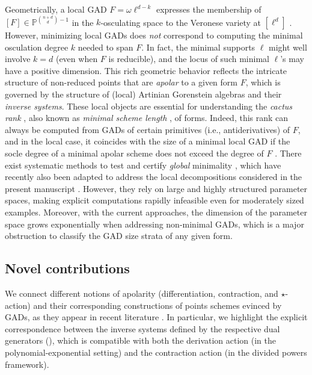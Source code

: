 \documentclass{amsart}
\theoremstyle{plain}
\renewcommand{\P}{\mathbb{P}}
\def\P{{\mathbb{P}}}
\numberwithin{equation}{section}
\begin{document}
Geometrically, a local GAD $F = \omega \ell^{d-k}$ expresses the membership of $[F] \in \P^{{n+d \choose d}-1}$ in the $k$-osculating space to the Veronese variety at $[\ell^d]$ \cite{BMT25,BCGI07}. 
However, minimizing local GADs does \emph{not} correspond to computing the minimal osculation degree $k$ needed to span $F$. %
In fact, the minimal supports $\ell$ might well involve $k=d$ (even when $F$ is reducible), and the locus of such minimal $\ell$'s may have a positive dimension.
This rich geometric behavior reflects the intricate structure of non-reduced points that are \emph{apolar} to a given form $F$, which is governed by the structure of (local) Artinian Gorenstein algebras and their \emph{inverse systems}.
These local objects are essential for understanding the \emph{cactus rank} \cite{BB14}, also known as \emph{minimal scheme length} \cite{IK99}, of forms.
Indeed, this rank can always be computed from GADs of certain primitives (i.e., antiderivatives) of $F$, and in the local case, it coincides with the size of a minimal local GAD if the socle degree of a minimal apolar scheme does not exceed the degree of $F$ \cite{BOT24}.
There exist systematic methods to test and certify \emph{global} minimality \cite{BMT25,BT20}, which have recently also been adapted to address the local decompositions considered in the present manuscript \cite{BF25}.
However, they rely on large and highly structured parameter spaces, making explicit computations rapidly infeasible even for moderately sized examples.
Moreover, with the current approaches, the dimension of the parameter space grows exponentially when addressing non-minimal GADs, which is a major obstruction to classify the GAD size strata of any given form.

\subsection*{Novel contributions}
We connect different notions of apolarity (differentiation, contraction, and $\star$-action) and their corresponding constructions of points schemes evinced by GADs, as they appear in recent literature \cite{BMT25,BJMR18,BOT24}.
In particular, we highlight the explicit correspondence between the inverse systems defined by the respective dual generators (), which is compatible with both the derivation action (in the polynomial-exponential setting) and the contraction action (in the divided powers framework).
\end{document}
